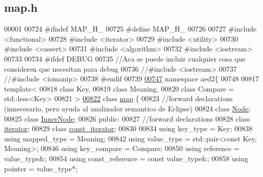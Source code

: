 \hypertarget{map_8h_source}{\subsection{map.\-h}
}

\begin{DoxyCode}
00001 
00724 \textcolor{preprocessor}{#ifndef MAP\_H\_}
00725 \textcolor{preprocessor}{}\textcolor{preprocessor}{#define MAP\_H\_}
00726 \textcolor{preprocessor}{}
00727 \textcolor{preprocessor}{#include <functional>}
00728 \textcolor{preprocessor}{#include <iterator>}
00729 \textcolor{preprocessor}{#include <utility>}
00730 \textcolor{preprocessor}{#include <cassert>}
00731 \textcolor{preprocessor}{#include <algorithm>}
00732 \textcolor{preprocessor}{#include <iostream>}
00733 
00734 \textcolor{preprocessor}{#ifdef DEBUG}
00735 \textcolor{preprocessor}{}\textcolor{comment}{//Aca se puede incluir cualquier cosa que consideren que necesitan para debug}
00736 \textcolor{comment}{//#include <iostream>}
00737 \textcolor{comment}{//#include <iomanip>}
00738 \textcolor{preprocessor}{#endif}
00739 \textcolor{preprocessor}{}
\hypertarget{map_8h_source_l00747}{}\hyperlink{namespaceaed2}{00747} \textcolor{keyword}{namespace }aed2\{
00748 
00817 \textcolor{keyword}{template}<
00818   \textcolor{keyword}{class }Key,
00819   \textcolor{keyword}{class }Meaning,
00820   \textcolor{keyword}{class }Compare = std::less<Key>
00821 >
\hypertarget{map_8h_source_l00822}{}\hyperlink{classaed2_1_1map}{00822} \textcolor{keyword}{class }\hyperlink{classaed2_1_1map}{map} \{
00823     \textcolor{comment}{//forward declarations (innecesario, pero ayuda al analizador semantico de
       Eclipse)}
00824     \textcolor{keyword}{class }\hyperlink{structaed2_1_1map_1_1Node}{Node};
00825     \textcolor{keyword}{class }\hyperlink{structaed2_1_1map_1_1InnerNode}{InnerNode};
00826 \textcolor{keyword}{public}:
00827     \textcolor{comment}{//forward declarations}
00828     \textcolor{keyword}{class }\hyperlink{classaed2_1_1map_1_1iterator}{iterator};
00829     \textcolor{keyword}{class }\hyperlink{classaed2_1_1map_1_1const__iterator}{const_iterator};
00830 
00834     \textcolor{keyword}{using} key\_type = Key;
00838     \textcolor{keyword}{using} mapped\_type = Meaning;
00842     \textcolor{keyword}{using} value\_type = std::pair<const Key, Meaning>;
00846     \textcolor{keyword}{using} key\_compare = Compare;
00850     \textcolor{keyword}{using} reference = value\_type&;
00854     \textcolor{keyword}{using} const\_reference = \textcolor{keyword}{const} value\_type&;
00858     \textcolor{keyword}{using} pointer = value\_type*;

\end{DoxyCode}

